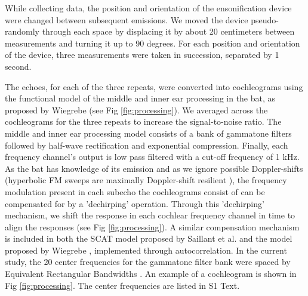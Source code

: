 \documentclass[10pt,letterpaper]{article}
\begin{document}
While collecting data, the position and orientation of the ensonification device were changed between subsequent emissions. We moved the device pseudo-randomly through each space by displacing it by about 20 centimeters between measurements and turning it up to 90 degrees. For each position and orientation of the device, three measurements were taken in succession, separated by 1 second.

The echoes, for each of the three repeats, were converted into cochleograms using the functional model of the middle and inner ear processing in the bat, as proposed by Wiegrebe \cite{Wiegrebe2008} (see Fig \ref{fig:processing}). We averaged across the cochleograms for the three repeats to increase the signal-to-noise ratio. The middle and inner ear processing model consists of a bank of gammatone filters followed by half-wave rectification and exponential compression. Finally, each frequency channel's output is low pass filtered with a cut-off frequency of 1 kHz. As the bat has knowledge of its emission and as we ignore possible Doppler-shifts (hyperbolic FM sweeps are maximally Doppler-shift resilient \cite{Altes1976,Holderied2008}), the frequency modulation present in each subecho the cochleograms consist of can be compensated for by a 'dechirping' operation. Through this 'dechirping' mechanism, we shift the response in each cochlear frequency channel in time to align the responses (see Fig \ref{fig:processing}). A similar compensation mechanism is included in both the SCAT model proposed by Saillant et al. \cite{Saillant1993} and the model proposed by Wiegrebe \cite{Wiegrebe2008}, implemented through autocorrelation. In the current study, the 20 center frequencies for the gammatone filter bank were spaced by Equivalent Rectangular Bandwidths \cite{Moore1983}. An example of a cochleogram is shown in Fig \ref{fig:processing}. The center frequencies are listed in S1 Text.
\end{document}

